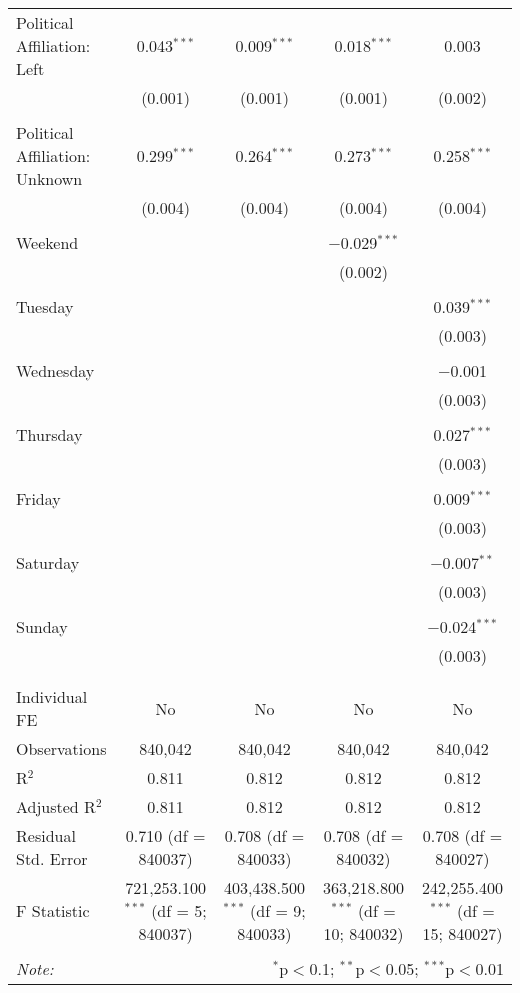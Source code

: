 \documentclass[
]{article}
\begin{document}
\begin{table}[!htbp]
{\begin{tabular}{@{\extracolsep{5pt}}lcccc}
 Political Affiliation: Left & 0.043$^{***}$ & 0.009$^{***}$ & 0.018$^{***}$ & 0.003 \\ 
  & (0.001) & (0.001) & (0.001) & (0.002) \\ 
  & & & & \\ 
 Political Affiliation: Unknown & 0.299$^{***}$ & 0.264$^{***}$ & 0.273$^{***}$ & 0.258$^{***}$ \\ 
  & (0.004) & (0.004) & (0.004) & (0.004) \\ 
  & & & & \\ 
 Weekend &  &  & $-$0.029$^{***}$ &  \\ 
  &  &  & (0.002) &  \\ 
  & & & & \\ 
 Tuesday &  &  &  & 0.039$^{***}$ \\ 
  &  &  &  & (0.003) \\ 
  & & & & \\ 
 Wednesday &  &  &  & $-$0.001 \\ 
  &  &  &  & (0.003) \\ 
  & & & & \\ 
 Thursday &  &  &  & 0.027$^{***}$ \\ 
  &  &  &  & (0.003) \\ 
  & & & & \\ 
 Friday &  &  &  & 0.009$^{***}$ \\ 
  &  &  &  & (0.003) \\ 
  & & & & \\ 
 Saturday &  &  &  & $-$0.007$^{**}$ \\ 
  &  &  &  & (0.003) \\ 
  & & & & \\ 
 Sunday &  &  &  & $-$0.024$^{***}$ \\ 
  &  &  &  & (0.003) \\ 
  & & & & \\ 
\hline \\[-1.8ex] 
Individual FE & No & No & No & No \\ 
Observations & 840,042 & 840,042 & 840,042 & 840,042 \\ 
R$^{2}$ & 0.811 & 0.812 & 0.812 & 0.812 \\ 
Adjusted R$^{2}$ & 0.811 & 0.812 & 0.812 & 0.812 \\ 
Residual Std. Error & 0.710 (df = 840037) & 0.708 (df = 840033) & 0.708 (df = 840032) & 0.708 (df = 840027) \\ 
F Statistic & 721,253.100$^{***}$ (df = 5; 840037) & 403,438.500$^{***}$ (df = 9; 840033) & 363,218.800$^{***}$ (df = 10; 840032) & 242,255.400$^{***}$ (df = 15; 840027) \\ 
\hline 
\hline \\[-1.8ex] 
\textit{Note:}  & \multicolumn{4}{r}{$^{*}$p$<$0.1; $^{**}$p$<$0.05; $^{***}$p$<$0.01} \\ 
\end{tabular}
} 
\end{table} 
\newpage
\end{document}
